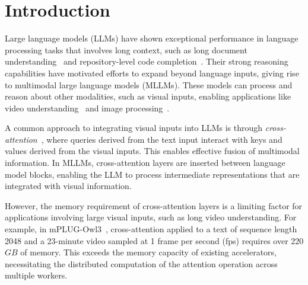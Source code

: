 \section{Introduction}
Large language models (LLMs) have shown exceptional performance in language processing tasks that involves long context, such as long document understanding~\cite{sun-2024-pearl, bertsch2023unlimiformer} and repository-level code completion~\cite{shrivastava23repollm, zhang2023repocoder}. Their strong reasoning capabilities have motivated efforts to expand beyond language inputs, giving rise to multimodal large language models (MLLMs). These models can process and reason about other modalities, such as visual inputs, enabling applications like video understanding~\cite{qian2024momentor, islam2024videorecap, he2024malmm} and image processing~\cite{qugo2024llava-uhd, li2023blip2}.

A common approach to integrating visual inputs into LLMs is through \textit{cross-attention}~\cite{alayrac2022flamingo, laurencon2023idefics, li2023otter, ye2024mplugowl3, grattafiori2024llama3v}, where queries derived from the text input interact with keys and values derived from the visual inputs. This enables effective fusion of multimodal information. In MLLMs, cross-attention layers are inserted between language model blocks, enabling the LLM to process intermediate representations that are integrated with visual information.

However, the memory requirement of cross-attention layers is a limiting factor for applications involving large visual inputs, such as long video understanding. For example, in mPLUG-Owl3~\cite{ye2024mplugowl3}, cross-attention applied to a text of sequence length 2048 and a 23-minute video sampled at 1 frame per second (fps) requires over 220$GB$ of memory. This exceeds the memory capacity of existing accelerators, necessitating the distributed computation of the attention operation across multiple workers. 

